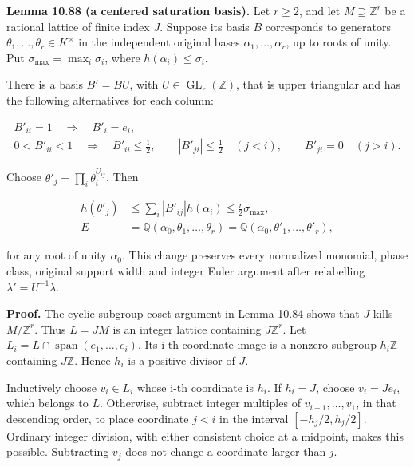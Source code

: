 \documentclass[
  11pt,
  a4paper,
]{article}
\begin{document}
\textbf{Lemma 10.88 (a centered saturation basis).} Let \(r\ge2\), and
let \(M\supseteq\mathbb Z^r\) be a rational lattice of finite index
\(J\). Suppose its basis \(B\) corresponds to generators
\(\theta_1,\ldots,\theta_r\in K^\times\) in the independent original
bases \(\alpha_1,\ldots,\alpha_r\), up to roots of unity. Put
\(\sigma_{\max}=\max_i\sigma_i\), where \(h(\alpha_i)\le\sigma_i\).

There is a basis \(B'=BU\), with \(U\in\operatorname{GL}_r(\mathbb Z)\),
that is upper triangular and has the following alternatives for each
column:

\[
\begin{gathered}
B'_{ii}=1\quad\Longrightarrow\quad B'_i=e_i,\\
0<B'_{ii}<1\quad\Longrightarrow\quad
 B'_{ii}\le\tfrac12,\qquad
 |B'_{ji}|\le\tfrac12\quad(j<i),\qquad B'_{ji}=0\quad(j>i).
\end{gathered}
\tag{10.229}
\]

Choose \(\theta'_j=\prod_i\theta_i^{U_{ij}}\). Then

\[
\begin{aligned}
h(\theta'_j)&\le\sum_i|B'_{ij}|h(\alpha_i)
\le\frac r2\sigma_{\max},\\
E&=\mathbb Q(\alpha_0,\theta_1,\ldots,\theta_r)
=\mathbb Q(\alpha_0,\theta'_1,\ldots,\theta'_r),
\end{aligned}
\tag{10.230}
\]

for any root of unity \(\alpha_0\). This change preserves every
normalized monomial, phase class, original support width and integer
Euler argument after relabelling \(\lambda'=U^{-1}\lambda\).

\textbf{Proof.} The cyclic-subgroup coset argument in Lemma 10.84 shows
that \(J\) kills \(M/\mathbb Z^r\). Thus \(L=JM\) is an integer lattice
containing \(J\mathbb Z^r\). Let
\(L_i=L\cap\operatorname{span}(e_1,\ldots,e_i)\). Its i-th coordinate
image is a nonzero subgroup \(h_i\mathbb Z\) containing \(J\mathbb Z\).
Hence \(h_i\) is a positive divisor of \(J\).

Inductively choose \(v_i\in L_i\) whose i-th coordinate is \(h_i\). If
\(h_i=J\), choose \(v_i=Je_i\), which belongs to \(L\). Otherwise,
subtract integer multiples of \(v_{i-1},\ldots,v_1\), in that descending
order, to place coordinate \(j<i\) in the interval \([-h_j/2,h_j/2]\).
Ordinary integer division, with either consistent choice at a midpoint,
makes this possible. Subtracting \(v_j\) does not change a coordinate
larger than \(j\).
\end{document}
